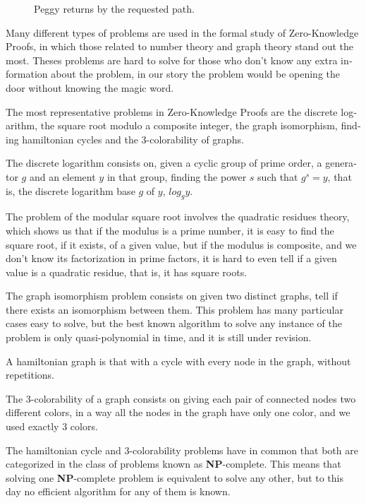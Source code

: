 \begin{otherlanguage}{english}
\begin{figure}[!htb]
	\caption*{Peggy returns by the requested path.\\ }\label{fig:3}
	\endminipage
\end{figure}



Many different types of problems are used in the formal study of Zero-Knowledge Proofs, in which those related to number theory and graph theory stand out the most. Theses problems are hard to solve for those who don't know any extra information about the problem, in our story the problem would be opening the door without knowing the magic word. 

The most representative problems in Zero-Knowledge Proofs are the discrete logarithm, the square root modulo a composite integer, the graph isomorphism, finding hamiltonian cycles and the 3-colorability of graphs.

The discrete logarithm consists on, given a cyclic group of prime order, a generator $g$ and an element $y$ in that group, finding the power $s$ such that $g^s=y$, that is, the discrete logarithm base $g$ of $y$, $log_g y$.

The problem of the modular square root involves the quadratic residues theory, which shows us that if the modulus is a prime number, it is easy to find the square root, if it exists, of a given value, but if the modulus is composite, and we don't know its factorization in prime factors, it is hard to even tell if a given value is a quadratic residue, that is, it has square roots.

The graph isomorphism problem consists on given two distinct graphs, tell if there exists an isomorphism between them. This problem has many particular cases easy to solve, but the best known algorithm to solve any instance of the problem is only quasi-polynomial in time, and it is still under revision.

A hamiltonian graph is that with a cycle with every node in the graph, without repetitions.

The 3-colorability of a graph consists on giving each pair of connected nodes two different colors, in a way all the nodes in the graph have only one color, and we used exactly 3 colors.

The hamiltonian cycle and 3-colorability problems have in common that both are categorized in the class of problems known as \textbf{NP}-complete. This means that solving one \textbf{NP}-complete problem is equivalent to solve any other, but to this day no efficient algorithm for any of them is known.



\end{otherlanguage}
